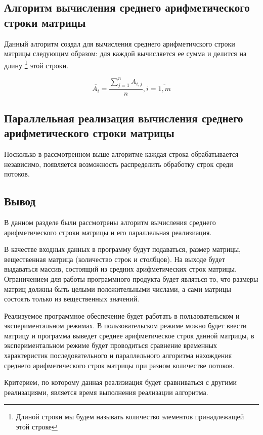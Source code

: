 \subsection{Алгоритм вычисления среднего арифметического строки матрицы}

Данный алгоритм создал для вычисления среднего арифметичского строки матрицы следующим образом: для каждой вычисляется ее сумма и делится на длину \footnote{Длиной строки мы будем называть количество элементов принадлежащей этой строке} этой строки.

\begin{equation}
    \bar{A_i} = \frac{\displaystyle\sum_{j = 1}^{n} A_{i, j}}{n}, i = \overline{1, m}
\end{equation}

\subsection{Параллельная реализация вычисления среднего арифметического строки матрицы}

Посколько в рассмотренном выше алгоритме каждая строка обрабатывается независимо, появляется возможность распределить обработку строк среди потоков.

\subsection{Вывод}

В данном разделе были рассмотрены алгоритм вычисления среднего арифметического строки матрицы и его параллельная реализиация.

В качестве входных данных в программу будут подаваться, размер матрицы, вещественная матрица (количество строк и столбцов). На выходе будет выдаваться массив, состоящий из средних арифметических строк матрицы. Ограничением для работы программного продукта будет являться то, что размеры матриц должны быть целыми положительными числами, а сами матрицы состоять только из вещественных значений. 

Реализуемое программное обеспечение будет работать в пользовательском и экспериментальном режимах. В пользовательском режиме можно будет ввести матрицу и программа выведет среднее арифметическое строк данной матрицы, в экспериментальном режиме будет проводиться сравнение временных характеристик последовательного и параллельного алгоритма нахождения среднего арифметического строк матрицы при разном количестве потоков.

Критерием, по которому данная реализиация будет сравниваться с другими реализациями, является время выполнения реализации алгоритма.


